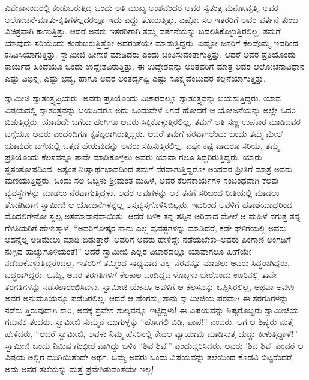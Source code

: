 ವಿವೇಕಾನಂದರಲ್ಲಿ ಕಂಡುಬರುತ್ತಿದ್ದ ಒಂದು ಅತಿ ಮುಖ್ಯ ಅಂಶವೆಂದರೆ ಅವರ ಸ್ವತಂತ್ರ ಮನೋವೃತ್ತಿ. ಅವರ ಆಲೋಚನೆ-ಮಾತು-ಕೃತಿಗಳೆಲ್ಲದರಲ್ಲೂ ಇದು ಎದ್ದು ತೋರುತ್ತಿತ್ತು. ಎಷ್ಟೋ ಸಲ ಇತರರಿಗೆ ಅವರ ವರ್ತನೆ ತುಂಬ ವಿಚಿತ್ರವಾಗಿ ಕಾಣುತ್ತಿತ್ತು. ಆದರೆ ಅವರು ಇತರರಿಗಾಗಿ ತಮ್ಮ ವರ್ತನೆಯನ್ನು ಬದಲಿಸಿಕೊಳ್ಳುತ್ತಿರಲಿಲ್ಲ. ತಮಗೆ ಯಾವುದು ಸರಿಯೆಂದು ಕಂಡುಬರುತ್ತಿತ್ತೋ ಅದರಂತೆಯೇ ಮಾಡುತ್ತಿದ್ದರು. ಎಷ್ಟೋ ಜನರಿಗೆ ಕೆಲವೊಮ್ಮೆ ಇದರಿಂದ ಕಸಿವಿಸಿಯಾಗುತ್ತಿತ್ತು. ಸ್ವಾಮೀಜಿ ಹೀಗೇಕೆ ಮಾಡಿದರು ಎಂದು ಚಿಂತಿಸುವಂತಾಗುತ್ತಿತ್ತು. ಆದರೆ ಅವರ ಪ್ರತಿಯೊಂದು ಕಾರ್ಯದ ಹಿಂದೆಯೂ ಒಂದು ಉದ್ದೇಶವಿರುತ್ತಿತ್ತು. ಈ ಉದ್ದೇಶವನ್ನು ಅರಿತವರಿಗೆ ಮಾತ್ರ ಅವರ ಆಲೋಚನಾವಿಧಾನ ಎಷ್ಟು ವಿಭಿನ್ನ, ಎಷ್ಟು ಭವ್ಯ, ಹಾಗೂ ಅವರ ಅಂತರ್ದೃಷ್ಟಿ ಎಷ್ಟು ಸೂಕ್ಷ್ಮವೆಂಬುದರ ಕಲ್ಪನೆಯಾಗುತ್ತಿತ್ತು.

ಸ್ವಾಮೀಜಿ ಸ್ವಾತಂತ್ರ್ಯಪ್ರಿಯರು. ಅವರು ಪ್ರತಿಯೊಂದು ವಿಚಾರದಲ್ಲೂ ಸ್ವಾತಂತ್ರ್ಯವನ್ನು ಬಯಸುತ್ತಿದ್ದರು. ಯಾವ ವಿಷಯದಲ್ಲಿ ಸ್ವಾತಂತ್ರ್ಯವನ್ನು ಬಯಸಿದರೂ ಅದು ಒಂದುವೇಳೆ ಸಿಗದೆ ಹೋದರೆ ಆ ಯೋಜನೆಯನ್ನು ಅಲ್ಲೇ ಒದರಿ ಬಿಡುತ್ತಿದ್ದರು. ಯಾವುದೇ ಬಗೆಯ ಹಂಗಿಗೂ ಅವರು ಸಿಕ್ಕಿಕೊಳ್ಳುತ್ತಿರಲಿಲ್ಲ. ತಮಗೆ ಅತಿ ಸಣ್ಣ ಉಪಕಾರ ಮಾಡಿದವರ ಬಗ್ಗೆಯೂ ಅವರು ಎಂದೆಂದಿಗೂ ಕೃತಜ್ಞರಾಗಿರುತ್ತಿದ್ದರು. ಆದರೆ ತಮಗೆ ನೆರವಾಗಲೆಂದು ಬಂದು ತಮ್ಮ ಮೇಲೆ ಯಾವುದೇ ಬಗೆಯಲ್ಲಿ ಒತ್ತಡ ಹೇರುವುದನ್ನು ಅವರು ಸಹಿಸುತ್ತಿರಲಿಲ್ಲ. ಎಷ್ಟೇ ಕಷ್ಟ ವಾದರೂ ಸರಿಯೆ, ತಮ್ಮ ಪ್ರತಿಯೊಂದು ಕೆಲಸವನ್ನೂ ತಾವೇ ಮಾಡಿಕೊಳ್ಳಲು ಅವರು ಯಾವಾ ಗಲೂ ಸಿದ್ಧರಿರುತ್ತಿದ್ದರು. ಯಾರು ಸ್ವಸಂತೋಷದಿಂದ, ಅತ್ಯಂತ ನಿಃಸ್ವಾರ್ಥಭಾವದಿಂದ ತಮಗೆ ನೆರವಾಗುತ್ತಿದ್ದರೋ ಅಂಥವರ ಪ್ರೀತಿಗೆ ಮಾತ್ರ ಅವರು ಮಣಿಯುತ್ತಿದ್ದರು. ಒಂದು ಸಲ ಒಬ್ಬಳು ಶ್ರೀಮಂತ ಮಹಿಳೆ, ಅವರ ಕೆಲಸಕಾರ್ಯಗಳ ಸಂಬಂಧವಾಗಿ ಕೆಲವು ವ್ಯವಸ್ಥೆಗಳನ್ನು ಮಾಡಲು ನೆರವಾಗುತ್ತಿದ್ದಳು. ಆದರೆ ಅವುಗಳನ್ನು ಆಕೆ ತನಗೆ ಸರಿಬಂದ ರೀತಿಯಲ್ಲಿ ಮಾಡಲು ತೊಡಗಿದಾಗ ಸ್ವಾಮೀಜಿ ಆ ಯೋಜನೆಗಳನ್ನೆಲ್ಲ ಅಸ್ತವ್ಯಸ್ತಗೊಳಿಸಿಬಿಟ್ಟರು. ಇದರಿಂದ ಅವಳಿಗೆ ಹತಾಶೆಯಾದ್ದರಿಂದ ಮೊದಲಿಗೇನೋ ಸ್ವಲ್ಪ ಅಸಮಾಧಾನವಾಯಿತು. ಆದರೆ ಬಳಿಕ ತನ್ನ ತಪ್ಪಿನ ಅರಿವಾದ ಮೇಲೆ ಆ ಮಹಿಳೆ ನಗುತ್ತ ತನ್ನ ಗೆಳತಿಯರಿಗೆ ಹೇಳುತ್ತಾಳೆ, “ಅವರಿಗೋಸ್ಕರ ನಾನು ಎಲ್ಲ ವ್ಯವಸ್ಥೆಗಳನ್ನು ಮಾಡಿದರೆ, ಕಡೇ ಘಳಿಗೆಯಲ್ಲಿ ಅವರು ಅದನ್ನೆಲ್ಲ ಅಡಿಮೇಲು ಮಾಡಿ ಬಿಡುತ್ತಾರೆ. ಅವರಿಗೆ ಅವರು ಹೇಳಿದ್ದೇ ನಡೆಯಬೇಕು–ಅವರು ಪಿಂಗಾಣಿ ಅಂಗಡಿಗೆ ನುಗ್ಗಿದ ಹುಚ್ಚುಗೂಳಿಯಂತೆ!” ಆದರೆ ಸ್ವಾಮೀಜಿ ಎಲ್ಲರ ವಿಚಾರದಲ್ಲೂ ಯಾವಾಗಲೂ ಹೀಗೆಯೇ ನಡೆದುಕೊಳ್ಳುತ್ತಿದ್ದರೆಂದಲ್ಲ. ಇತರರಿಗೆ ತಮ್ಮಿಂದ ಸಾಧ್ಯವಾದ ಎಲ್ಲ ನೆರವನ್ನೂ ಮಾಡಲು ಅವರು ಸಿದ್ಧರಾಗಿದ್ದರು, ಬದ್ಧರಾಗಿದ್ದರು. ಒಮ್ಮೆ, ಅವರ ತರಗತಿಗಳಿಗೆ ಕೆಲಕಾಲ ಬಂದಿದ್ದವ ಳೊಬ್ಬಳು ಬೇರೊಂದು ಊರಿನಲ್ಲಿ ತಾನೇ ತರಗತಿಗಳನ್ನು ನಡೆಸಲಾರಂಭಿಸಿದಳು. ಸ್ವಾಮೀಜಿ ಯೇನೂ ಅವಳಿಗೆ ಆ ಕೆಲಸವನ್ನು ಒಪ್ಪಿಸಿರಲಿಲ್ಲ, ಅಥವಾ ಅವಳು ಅವರ ಅನುಮತಿಯನ್ನೂ ಪಡೆದಿರಲಿಲ್ಲ. ಆದರೆ ಆ ಹೆಂಗಸು, ತಾನು ಸ್ವಾಮೀಜಿಯ ಪರವಾಗಿ ಈ ತರಗತಿಗಳನ್ನು ನಡೆಸು ತ್ತಿರುವುದಾಗಿ ಸಾರಿ, ಅದಕ್ಕೆ ಪ್ರವೇಶ ಶುಲ್ಕವನ್ನೂ ಇಟ್ಟಿದ್ದಳು! ಈ ವಿಷಯವನ್ನು ಶಿಷ್ಯರೊಬ್ಬರು ಸ್ವಾಮೀಜಿಯ ಗಮನಕ್ಕೆ ತಂದರು. ಸ್ವಾಮೀಜಿ ಸುಮ್ಮನೆ ಮುಗುಳ್ನಕ್ಕು “ಹೋಗಲಿ ಬಿಡಿ, ಪಾಪ!” ಎಂದರು. ಆಗ ಆ ಶಿಷ್ಯರು ಮತ್ತೆ ಹೇಳಿದರು, “ಆದರೆ ಸ್ವಾಮೀಜಿ, ಅವಳು ನಿಮ್ಮ ಹೆಸರಿನಲ್ಲಿ ಕೇವಲ ವ್ಯಾಯಾಮ ಮಾಡಿಸುತ್ತ ದುಡ್ಡು ಕೀಳುತ್ತಿದ್ದಾಳೆ!” ಸ್ವಾಮೀಜಿ ಒಂದು ನಿಮಿಷ ಗಂಭೀರ ವಾಗಿದ್ದು ಬಳಿಕ “ಶಿವ ಶಿವ!” ಎಂದುದ್ಗರಿಸಿದರು. ಅವರು ‘ಶಿವ ಶಿವ’ ಎಂದರೆ ಆ ವಿಷಯ ಅಲ್ಲಿಗೆ ಮುಗಿಯಿತೆಂದೇ ಅರ್ಥ. ಒಮ್ಮೆ ಅವರು ಒಂದು ವಿಷಯವನ್ನು ತಲೆಯಿಂದ ಕೊಡವಿ ಬಿಟ್ಟರೆಂದರೆ, ಅದು ಅವರ ತಲೆಯನ್ನು ಮತ್ತೆ ಪ್ರವೇಶಿಸುವಂತೆಯೇ ಇಲ್ಲ!

